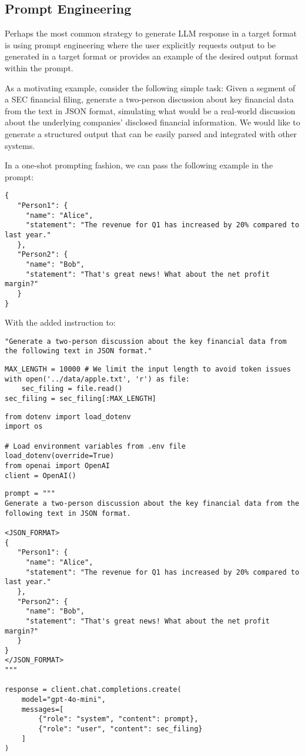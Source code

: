 \subsection{Prompt Engineering}

Perhaps the most common strategy to generate LLM response in a target format is using prompt engineering where the user explicitly requests output to be generated in a target format or provides an example of the desired output format within the prompt.

As a motivating example, consider the following simple task: Given a segment of a SEC financial filing, generate a two-person discussion about key financial data from the text in JSON format, simulating what would be a real-world discussion about the underlying companies' disclosed financial information. We would like to generate a structured output that can be easily parsed and integrated with other systems.

In a one-shot prompting fashion, we can pass the following example in the prompt:
\begin{verbatim}
{
   "Person1": {
     "name": "Alice", 
     "statement": "The revenue for Q1 has increased by 20% compared to last year."
   },
   "Person2": {
     "name": "Bob",
     "statement": "That's great news! What about the net profit margin?"
   }
}
\end{verbatim}
With the added instruction to:

\begin{verbatim}
"Generate a two-person discussion about the key financial data from the following text in JSON format."
\end{verbatim}

\begin{verbatim}
MAX_LENGTH = 10000 # We limit the input length to avoid token issues 
with open('../data/apple.txt', 'r') as file:
    sec_filing = file.read()
sec_filing = sec_filing[:MAX_LENGTH] 
\end{verbatim}

\begin{verbatim}
from dotenv import load_dotenv
import os

# Load environment variables from .env file
load_dotenv(override=True)
from openai import OpenAI
client = OpenAI()
\end{verbatim}

\begin{verbatim}
prompt = """
Generate a two-person discussion about the key financial data from the following text in JSON format.

<JSON_FORMAT>
{
   "Person1": {
     "name": "Alice", 
     "statement": "The revenue for Q1 has increased by 20% compared to last year."
   },
   "Person2": {
     "name": "Bob",
     "statement": "That's great news! What about the net profit margin?"
   }
}
</JSON_FORMAT>
"""

response = client.chat.completions.create(
    model="gpt-4o-mini",
    messages=[
        {"role": "system", "content": prompt},
        {"role": "user", "content": sec_filing}
    ]
)
\end{verbatim}

